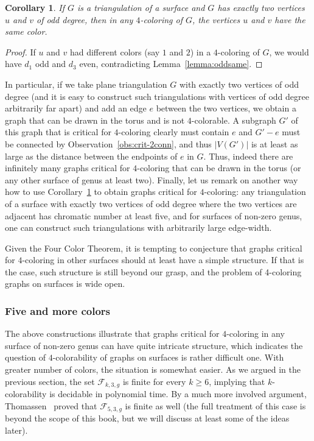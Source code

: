 \documentclass[12pt,twoside,openright,a4paper]{book}
\newtheorem{corollary}[theorem]{Corollary}
\newcommand{\FF}{\mathcal{F}}
\begin{document}
\begin{corollary}\label{cor:oddsame}
If $G$ is a triangulation of a surface and $G$ has exactly two vertices $u$ and $v$ of odd degree,
then in any $4$-coloring of $G$, the vertices $u$ and $v$ have the same color.
\end{corollary}
\begin{proof}
If $u$ and $v$ had different colors (say $1$ and $2$) in a $4$-coloring of $G$, we would have $d_1$ odd
and $d_3$ even, contradicting Lemma~\ref{lemma:oddsame}.
\end{proof}
In particular, if we take plane triangulation $G$ with exactly two vertices of odd degree (and it is easy to
construct such triangulations with vertices of odd degree arbitrarily far apart) and add an edge $e$ between
the two vertices, we obtain a graph that can be drawn in the torus and is not $4$-colorable.
A subgraph $G'$ of this graph that is critical for $4$-coloring clearly must contain $e$ and $G'-e$ must be connected
by Observation~\ref{obs:crit-2conn}, and thus $|V(G')|$ is at least as large as the distance between the endpoints
of $e$ in $G$.  Thus, indeed there are infinitely many graphs critical for $4$-coloring that can be drawn
in the torus (or any other surface of genus at least two).  Finally, let us remark on another way how to use
Corollary~\ref{cor:oddsame} to obtain graphs critical for $4$-coloring: any triangulation of a surface
with exactly two vertices of odd degree where the two vertices are adjacent has chromatic number at least five,
and for surfaces of non-zero genus, one can construct such triangulations with arbitrarily large edge-width.

Given the Four Color Theorem, it is tempting to conjecture that graphs critical for $4$-coloring in other surfaces
should at least have a simple structure.  If that is the case, such structure is still beyond our grasp,
and the problem of 4-coloring graphs on surfaces is wide open.

\subsubsection*{Five and more colors}
The above constructions illustrate that graphs critical for $4$-coloring in any surface of non-zero genus
can have quite intricate structure, which indicates the question of $4$-colorability of graphs on surfaces
is rather difficult one.  With greater number of colors, the situation is somewhat easier.
As we argued in the previous section, the set $\FF_{k,3,g}$ is finite for every $k\ge 6$,
implying that $k$-colorability is decidable in polynomial time.  By a much more involved argument,
Thomassen~\cite{Thomassen97} proved that $\FF_{5,3,g}$ is finite as well (the full treatment of
this case is beyond the scope of this book, but we will discuss at least some of the ideas later).
\end{document}
